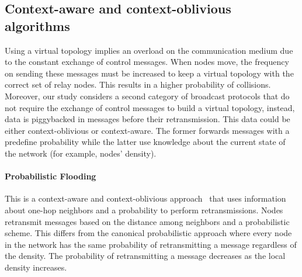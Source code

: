 \subsection{Context-aware and context-oblivious algorithms}
Using a virtual topology implies an overload on the communication medium due to the constant exchange of control messages.
%
When nodes move, the frequency on sending these messages must be increased to keep a virtual topology with the correct set of relay nodes.
%
This results in a higher probability of collisions.
%
Moreover, our study considers a second category of broadcast protocols that do not require the exchange of control messages to build a virtual topology, instead, data is piggybacked in messages before their retransmission.
%
This data could be either context-oblivious or context-aware.
%
The former forwards messages with a predefine probability while the latter use knowledge about the current state of the network (for example, nodes' density).
%
%

%
\paragraph{Probabilistic Flooding} This is a context-aware and context-oblivious approach~\cite{Cartigny:2003:BNR:2727141.2727459} that uses information about one-hop neighbors and a probability to perform retransmissions.
%
Nodes retransmit messages based on the distance among neighbors and a probabilistic scheme.
%
This differs from the canonical probabilistic approach where every node in the network has the same probability of retransmitting a message regardless of the density.
%
The probability of retransmitting a message decreases as the local density increases.

